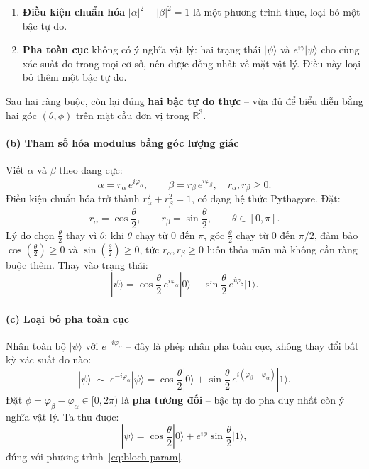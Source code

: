 \begin{enumerate}
    \item \textbf{Điều kiện chuẩn hóa} $|\alpha|^2 + |\beta|^2 = 1$ là một
          phương trình thực, loại bỏ một bậc tự do.
    \item \textbf{Pha toàn cục} không có ý nghĩa vật lý: hai trạng thái
          $|\psi\rangle$ và $e^{i\gamma}|\psi\rangle$ cho cùng xác suất đo
          trong mọi cơ sở, nên được đồng nhất về mặt vật lý. Điều này loại
          bỏ thêm một bậc tự do.
\end{enumerate}

Sau hai ràng buộc, còn lại đúng \textbf{hai bậc tự do thực} -- vừa đủ để biểu
diễn bằng hai góc $(\theta, \phi)$ trên mặt cầu đơn vị trong $\mathbb{R}^3$.


\paragraph{(b) Tham số hóa modulus bằng góc lượng giác}

Viết $\alpha$ và $\beta$ theo dạng cực:
\[
    \alpha = r_\alpha \, e^{i\varphi_\alpha}, \qquad
    \beta  = r_\beta  \, e^{i\varphi_\beta},
    \quad r_\alpha, r_\beta \geq 0.
\]
Điều kiện chuẩn hóa trở thành $r_\alpha^2 + r_\beta^2 = 1$, có dạng hệ thức
Pythagore. Đặt:
\[
    r_\alpha = \cos\frac{\theta}{2}, \qquad
    r_\beta  = \sin\frac{\theta}{2}, \qquad \theta \in [0, \pi].
\]
Lý do chọn $\frac{\theta}{2}$ thay vì $\theta$: khi $\theta$ chạy từ $0$ đến $\pi$,
góc $\frac{\theta}{2}$ chạy từ $0$ đến $\pi/2$, đảm bảo $\cos(\frac{\theta}{2}) \geq 0$ và
$\sin(\frac{\theta}{2}) \geq 0$, tức $r_\alpha, r_\beta \geq 0$ luôn thỏa mãn mà
không cần ràng buộc thêm. Thay vào trạng thái:
\[
    |\psi\rangle
    = \cos\frac{\theta}{2}\,e^{i\varphi_\alpha}|0\rangle
    + \sin\frac{\theta}{2}\,e^{i\varphi_\beta}|1\rangle.
\]

\paragraph{(c) Loại bỏ pha toàn cục}

Nhân toàn bộ $|\psi\rangle$ với $e^{-i\varphi_\alpha}$ -- đây là phép nhân
pha toàn cục, không thay đổi bất kỳ xác suất đo nào:
\[
    |\psi\rangle \;\sim\; e^{-i\varphi_\alpha}|\psi\rangle
    = \cos\frac{\theta}{2}|0\rangle
    + \sin\frac{\theta}{2}\,e^{i(\varphi_\beta - \varphi_\alpha)}|1\rangle.
\]
Đặt $\phi = \varphi_\beta - \varphi_\alpha \in [0, 2\pi)$ là \textbf{pha tương
đối} -- bậc tự do pha duy nhất còn ý nghĩa vật lý. Ta thu được:
\[
    |\psi\rangle = \cos\frac{\theta}{2}|0\rangle
                + e^{i\phi}\sin\frac{\theta}{2}|1\rangle,
\]
đúng với phương trình~\eqref{eq:bloch-param}.